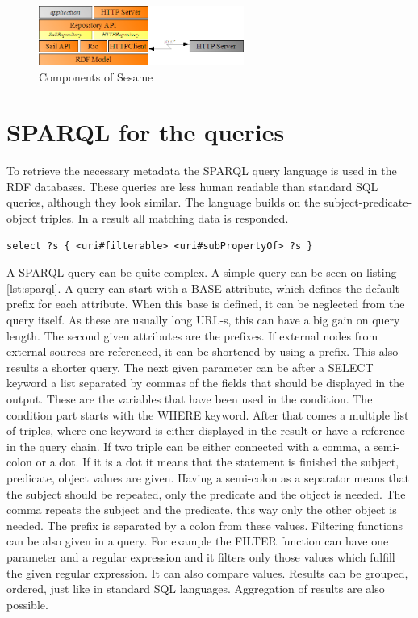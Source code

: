 \begin{figure}[h]
\centering
\includegraphics[width=0.6\textwidth]{figures/sesame-components.png}
\caption{Components of Sesame\label{fig:sesame}}
\end{figure}

\section{SPARQL for the queries}

To retrieve the necessary metadata the SPARQL query language is used in the RDF databases. These queries are less human readable than standard SQL queries, although they look similar. The language builds on the subject-predicate-object triples. In a result all matching data is responded. 

\begin{lstlisting}[caption={Sample SPARQL that queries all filterable objects\label{lst:sparql}}]
select ?s { <uri#filterable> <uri#subPropertyOf> ?s }
\end{lstlisting}

A SPARQL query can be quite complex. A simple query can be seen on listing \ref{lst:sparql}. A query can start with a BASE attribute, which defines the default prefix for each attribute. When this base is defined, it can be neglected from the query itself. As these are usually long URL-s, this can have a big gain on query length. The second given attributes are the prefixes. If external nodes from external sources are referenced, it can be shortened by using a prefix. This also results a shorter query. The next given parameter can be after a SELECT keyword a list separated by commas of the fields that should be displayed in the output. These are the variables that have been used in the condition. 
The condition part starts with the WHERE keyword. After that comes a multiple list of triples, where one keyword is either displayed in the result or have a reference in the query chain. If two triple can be either connected with a comma, a semi-colon or a dot. If it is a dot it means that the statement is finished the subject, predicate, object values are given. Having a semi-colon as a separator means that the subject should be repeated, only the predicate and the object is needed. The comma repeats the subject and the predicate, this way only the other object is needed. The prefix is separated by a colon from these values. Filtering functions can be also given in a query. For example the FILTER function can have one parameter and a regular expression and it filters only those values which fulfill the given regular expression. It can also compare values. Results can be grouped, ordered, just like in standard SQL languages. Aggregation of results are also possible. 

